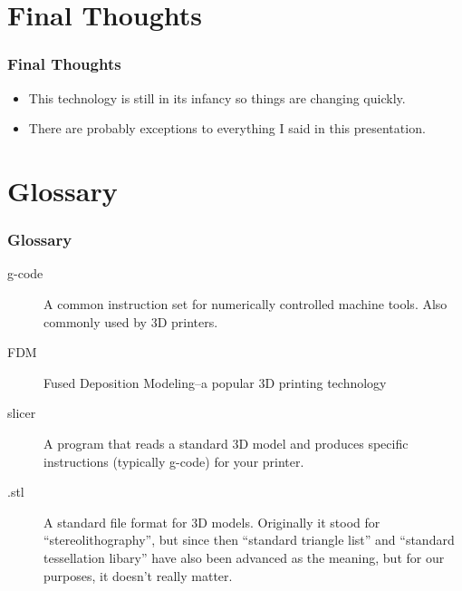 \documentclass[english,10pt]{beamer}
\begin{document}
\section{Final Thoughts}
\begin{frame}
  \frametitle{Final Thoughts}
  \begin{itemize}
    \item This technology is still in its infancy so things are changing quickly.
    \item There are probably exceptions to everything I said in this presentation.
  \end{itemize}
\end{frame}

\section{Glossary}
\begin{frame}
  \frametitle{Glossary}
  \begin{description}
    \item [g-code] A common instruction set for numerically controlled machine tools.  Also commonly used by 3D printers.
    \item [FDM] Fused Deposition Modeling--a popular 3D printing technology
    \item [slicer] A program that reads a standard 3D model and produces specific instructions (typically g-code) for your printer.
    \item [.stl] A standard file format for 3D models.  Originally it stood for ``stereolithography'',  but since then ``standard triangle list'' and ``standard tessellation libary'' have also been advanced as the meaning, but for our purposes, it doesn't really matter.
  \end{description}
\end{frame}
\end{document}
